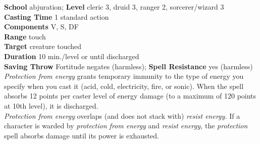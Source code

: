 \textbf{School} abjuration; \textbf{Level} cleric 3, druid 3, ranger 2, sorcerer/wizard 3\\
\textbf{Casting Time} 1 standard action\\
\textbf{Components} V, S, DF\\
\textbf{Range} touch\\
\textbf{Target} creature touched\\
\textbf{Duration} 10 min./level or until discharged\\
\textbf{Saving Throw} Fortitude negates (harmless); \textbf{Spell Resistance} yes (harmless)\\
\textit{Protection from energy }grants temporary immunity to the type of energy you specify when you cast it (acid, cold, electricity, fire, or sonic). When the spell absorbs 12 points per caster level of energy damage (to a maximum of 120 points at 10th level), it is discharged.\\
\textit{Protection from energy }overlaps (and does not stack with) \textit{resist energy. }If a character is warded by \textit{protection from energy }and \textit{resist energy, }the \textit{protection }spell absorbs damage until its power is exhausted.\\
